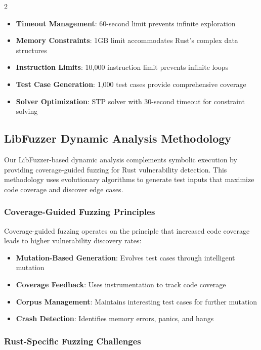 \documentclass[12pt,a4paper]{article}
\begin{document}
\begin{multicols}{2}
\begin{itemize}
    \item \textbf{Timeout Management}: 60-second limit prevents infinite exploration
    \item \textbf{Memory Constraints}: 1GB limit accommodates Rust's complex data structures
    \item \textbf{Instruction Limits}: 10,000 instruction limit prevents infinite loops
    \item \textbf{Test Case Generation}: 1,000 test cases provide comprehensive coverage
    \item \textbf{Solver Optimization}: STP solver with 30-second timeout for constraint solving
\end{itemize}

\subsection{LibFuzzer Dynamic Analysis Methodology}

Our LibFuzzer-based dynamic analysis complements symbolic execution by providing coverage-guided fuzzing for Rust vulnerability detection. This methodology uses evolutionary algorithms to generate test inputs that maximize code coverage and discover edge cases.

\subsubsection{Coverage-Guided Fuzzing Principles}

Coverage-guided fuzzing operates on the principle that increased code coverage leads to higher vulnerability discovery rates:

\begin{itemize}
    \item \textbf{Mutation-Based Generation}: Evolves test cases through intelligent mutation
    \item \textbf{Coverage Feedback}: Uses instrumentation to track code coverage
    \item \textbf{Corpus Management}: Maintains interesting test cases for further mutation
    \item \textbf{Crash Detection}: Identifies memory errors, panics, and hangs
\end{itemize}

\subsubsection{Rust-Specific Fuzzing Challenges}


\end{multicols}
\end{document}
